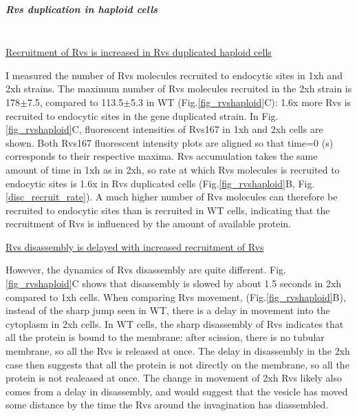 	



\newpage
\subparagraph{Rvs duplication in haploid cells}

	\mbox{}\\
	
  \underline{Recruitment of Rvs is increased in Rvs duplicated haploid cells}

I measured the number of Rvs molecules recruited to endocytic sites in 1xh and 2xh strains. The maximum number of Rvs molecules recruited in the 2xh strain is 178$\pm$7.5, compared to 113.5$\pm$5.3 in WT (Fig.\ref{fig_rvshaploid}C): 1.6x more Rvs is recruited to endocytic sites in the gene duplicated strain. In Fig.\ref{fig_rvshaploid}C, fluorescent intensities of Rvs167 in 1xh and 2xh cells are shown. Both Rvs167 fluorescent intensity plots are aligned so that time=0 (s) corresponds to their respective maxima. Rvs accumulation takes the same amount of time in 1xh as in 2xh, so rate at which Rvs molecules is recruited to endocytic sites is 1.6x in Rvs duplicated cells (Fig.\ref{fig_rvshaploid}B, Fig.\ref{disc_recruit_rate}). A much higher number of Rvs molecules can therefore be recruited to endocytic sites than is recruited in  WT cells, indicating that the recruitment of Rvs is influenced by the amount of available protein.

 \vspace{5mm}
\underline{Rvs disassembly is delayed with increased recruitment of Rvs}

However, the dynamics of Rvs disassembly are quite different. Fig.\ref{fig_rvshaploid}C shows that disassembly is slowed by about 1.5 seconds in 2xh compared to 1xh cells. When comparing Rvs movement, (Fig.\ref{fig_rvshaploid}B), instead of the sharp jump seen in WT, there is a delay in movement into the cytoplasm in 2xh cells. In WT cells, the sharp disassembly of Rvs indicates that all the protein is bound to the membrane: after scission, there is no tubular membrane, so all the Rvs is released at once. The delay in disassembly in the 2xh case then suggests that all the protein is not directly on the membrane, so all the protein is not realeased at once. The change in movement of 2xh Rvs likely also comes from a delay in disassembly, and would suggest that the vesicle has moved some distance by the time the Rvs around the invagination has diassembled. 
\vspace{5mm}

